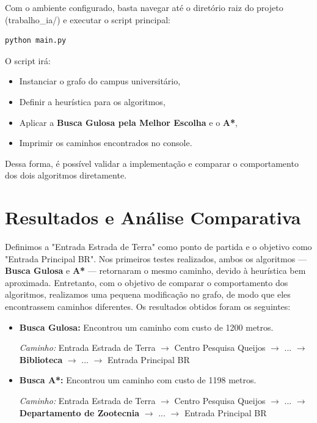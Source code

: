 \documentclass[12pt, a4paper]{article}
\begin{document}
Com o ambiente configurado, basta navegar até o diretório raiz do projeto (trabalho\_ia/) e executar o script principal:

\begin{verbatim}
python main.py
\end{verbatim}

O script irá:
\begin{itemize}
    \item Instanciar o grafo do campus universitário,
    \item Definir a heurística para os algoritmos,
    \item Aplicar a \textbf{Busca Gulosa pela Melhor Escolha} e o \textbf{A*},
    \item Imprimir os caminhos encontrados no console.
\end{itemize}

Dessa forma, é possível validar a implementação e comparar o comportamento dos dois algoritmos diretamente.

\section{Resultados e Análise Comparativa}


Definimos a "Entrada Estrada de Terra" como ponto de partida e o objetivo como "Entrada Principal BR". Nos primeiros testes realizados, ambos os algoritmos — \textbf{Busca Gulosa} e \textbf{A*} — retornaram o mesmo caminho, devido à heurística bem aproximada. Entretanto, com o objetivo de comparar o comportamento dos algoritmos, realizamos uma pequena modificação no grafo, de modo que eles encontrassem caminhos diferentes. Os resultados obtidos foram os seguintes:

\begin{itemize}
    \item \textbf{Busca Gulosa:} Encontrou um caminho com custo de 1200 metros.
    
    \textit{Caminho:} Entrada Estrada de Terra $\rightarrow$ Centro Pesquisa Queijos $\rightarrow$ ... $\rightarrow$ \textbf{Biblioteca} $\rightarrow$ ... $\rightarrow$ Entrada Principal BR

    \item \textbf{Busca A*:} Encontrou um caminho com custo de 1198 metros.
    
    \textit{Caminho:} Entrada Estrada de Terra $\rightarrow$ Centro Pesquisa Queijos $\rightarrow$ ... $\rightarrow$ \textbf{Departamento de Zootecnia} $\rightarrow$ ... $\rightarrow$ Entrada Principal BR
\end{itemize}
\end{document}
